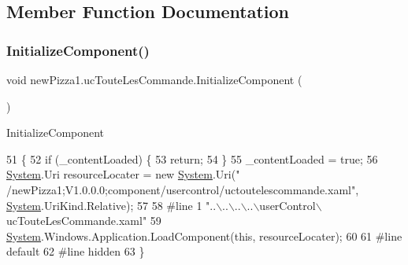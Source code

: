 \subsection{Member Function Documentation}
\mbox{\label{classnewPizza1_1_1ucTouteLesCommande_a8349ab5709ac09dd8c7e3f8d2cc0b633}} 
\subsubsection{\texorpdfstring{Initialize\+Component()}{InitializeComponent()}\hspace{0.1cm}{\footnotesize\ttfamily [1/6]}}
{\footnotesize\ttfamily void new\+Pizza1.\+uc\+Toute\+Les\+Commande.\+Initialize\+Component (\begin{DoxyParamCaption}{ }\end{DoxyParamCaption})\hspace{0.3cm}{\ttfamily [inline]}}



Initialize\+Component 


\begin{DoxyCode}
51                                           \{
52             \textcolor{keywordflow}{if} (\_contentLoaded) \{
53                 \textcolor{keywordflow}{return};
54             \}
55             \_contentLoaded = \textcolor{keyword}{true};
56             \hyperlink{namespaceSystem}{System}.Uri resourceLocater = \textcolor{keyword}{new} \hyperlink{namespaceSystem}{System}.Uri(\textcolor{stringliteral}{"
      /newPizza1;V1.0.0.0;component/usercontrol/uctoutelescommande.xaml"}, \hyperlink{namespaceSystem}{System}.UriKind.Relative);
57             
58 \textcolor{preprocessor}{            #line 1 "..\(\backslash\)..\(\backslash\)..\(\backslash\)..\(\backslash\)userControl\(\backslash\)ucTouteLesCommande.xaml"
}
59             \hyperlink{namespaceSystem}{System}.Windows.Application.LoadComponent(\textcolor{keyword}{this}, resourceLocater);
60             
61 \textcolor{preprocessor}{            #line default
}
62 \textcolor{preprocessor}{            #line hidden
}
63         \}
\end{DoxyCode}
\mbox{\label{classnewPizza1_1_1ucTouteLesCommande_a8349ab5709ac09dd8c7e3f8d2cc0b633}} 
